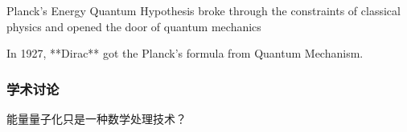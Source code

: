 \begin{frame}
    \begin{tcolorbox}[colback=yellow!10,colframe=red!75!black,title=Revolutionary Significance]
        Planck's Energy Quantum Hypothesis broke through the constraints of classical physics and 
        opened the door of quantum mechanics 
    \end{tcolorbox}
\end{frame}

\begin{frame}
    \begin{tcolorbox}[colback=yellow!10,colframe=red!75!black,title=THE END]
        In 1927, **Dirac** got the Planck's formula from Quantum Mechanism.
    \end{tcolorbox}
\end{frame}

\begin{frame}
    \frametitle{学术讨论}
    \begin{center}
        {\color{red} \Large 能量量子化只是一种数学处理技术？}  
    \end{center}
\end{frame}
